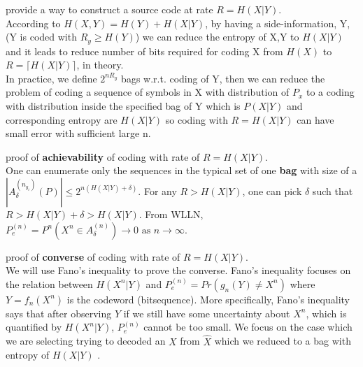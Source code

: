 \documentclass[
  course = {{EE623 Information Theory}},
  quartile = {{Fall 2020}},
  assignment = 4,
  name = {{Mohammad Mahdi Rahimi}},
  studentnumber = {{20208244}},
  email = {{mahi@kaist.ac.kr}},
  firstexercise = 1
]{aga-homework}
\begin{document}
\exercise
\subexercise provide a way to construct a source code at rate $R = H(X|Y)$.\\

According to $H(X,Y) = H(Y) + H(X|Y)$, by having a side-information, Y, (Y is coded with $R_y \ge H(Y)$) we can reduce the entropy of X,Y to $H(X|Y)$ and it leads to reduce number of bits required for coding X from $H(X)$ to $R = \lceil H(X|Y) \rceil$, in theory.\\

In practice, we define $2^{nR_y}$ bags w.r.t. coding of Y, then we can reduce the problem of coding a sequence of symbols in X with distribution of $P_x$ to a coding with distribution inside the specified bag of Y which is $P(X|Y)$ and corresponding entropy are $H(X|Y)$ so coding with $R = H(X|Y)$ can have small error with sufficient large n.

\subexercise proof of \textbf{achievability} of coding with rate of $R = H(X|Y)$.\\
One can enumerate only the sequences in the typical set of one \textbf{bag} with size of a  $|A^{(n_{y_i})}_\delta (P)| \le 2^{n(H(X|Y) + \delta)}$.  For any $R > H(X|Y)$, one can pick $\delta$ such that $R > H(X|Y)  + \delta > H(X|Y)$. From WLLN, $P^{(n)}_e = P^n(X^n \in A^{(n)}_\delta ) \rightarrow 0\text{ as }n \rightarrow \infty$.


\subexercise proof of \textbf{converse} of coding with rate of $R = H(X|Y)$.\\
We will use Fano’s inequality to prove the converse. Fano’s inequality focuses on the relation between $H(X^n|Y)$ and $P^{(n)}_e = Pr(g_n(Y) \neq X^n)$  where $Y = f_n(X^n)$ is the codeword (bitsequence).  More specifically, Fano’s inequality says that after observing $Y$ if we still have some uncertainty about $X^n$, which is quantified by $H(X^n|Y)$, $P^{(n)}_e$ cannot be too small.
We focus on the case which we are selecting trying to decoded an $X$ from $ \hat{X} $ which we reduced to a bag with entropy of $H(X|Y)$ .\\
\end{document}
